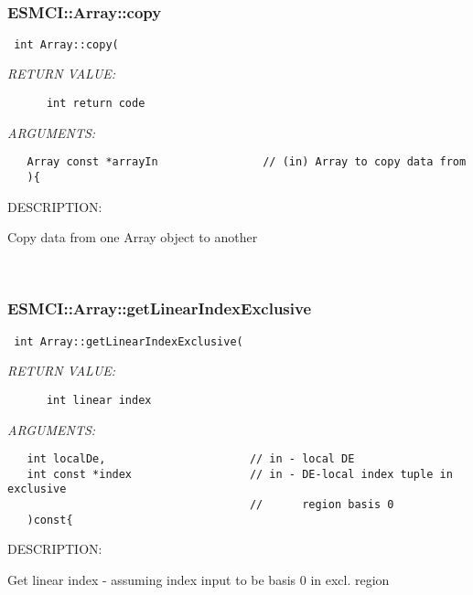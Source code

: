    
 
\mbox{}\hrulefill\
 
\subsubsection [ESMCI::Array::copy] {ESMCI::Array::copy}


  
\begin{verbatim} int Array::copy(\end{verbatim}{\em RETURN VALUE:}
\begin{verbatim}      int return code\end{verbatim}{\em ARGUMENTS:}
\begin{verbatim}   Array const *arrayIn                // (in) Array to copy data from
   ){\end{verbatim}
{\sf DESCRIPTION:\\ }


      Copy data from one Array object to another
   
 
\mbox{}\hrulefill\
 
\subsubsection [ESMCI::Array::getLinearIndexExclusive] {ESMCI::Array::getLinearIndexExclusive}


  
\begin{verbatim} int Array::getLinearIndexExclusive(\end{verbatim}{\em RETURN VALUE:}
\begin{verbatim}      int linear index\end{verbatim}{\em ARGUMENTS:}
\begin{verbatim}   int localDe,                      // in - local DE
   int const *index                  // in - DE-local index tuple in exclusive
                                     //      region basis 0
   )const{\end{verbatim}
{\sf DESCRIPTION:\\ }


      Get linear index - assuming index input to be basis 0 in excl. region
   
 

